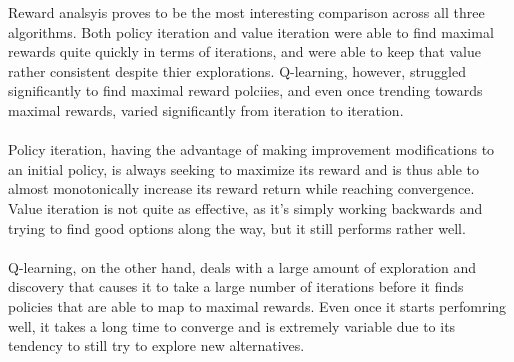 \documentclass[h]{article}
\begin{document}
Reward analsyis proves to be the most interesting comparison across all three 
algorithms.  Both policy iteration and value iteration were able to find maximal 
rewards quite quickly in terms of iterations, and were able to keep that value 
rather consistent despite thier explorations.  Q-learning, however, struggled 
significantly to find maximal reward polciies, and even once trending towards 
maximal rewards, varied significantly from iteration to iteration.
\\ \\
Policy iteration, having the advantage of making improvement modifications to an 
initial policy, is always seeking to maximize its reward and is thus able to 
almost monotonically increase its reward return while reaching convergence.  
Value iteration is not quite as effective, as it's simply working backwards and 
trying to find good options along the way, but it still performs rather well.  
\\ \\
Q-learning, on the other hand, deals with a large amount of exploration and 
discovery that causes it to take a large number of iterations before it finds 
policies that are able to map to maximal rewards.  Even once it starts 
perfomring well, it takes a long time to converge and is extremely variable due 
to its tendency to still try to explore new alternatives.
\end{document}
